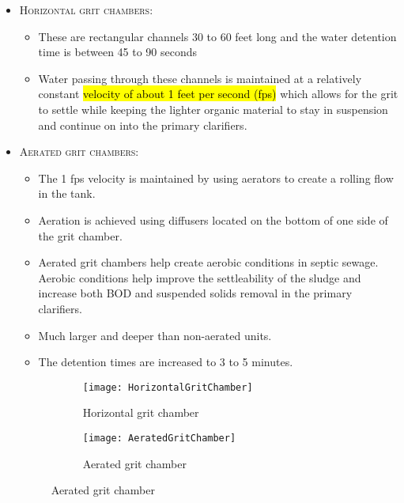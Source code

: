 			\begin{itemize}
			
					\item \noindent\textsc{Horizontal grit chambers:}

					\begin{itemize}
						\item These are rectangular channels 30 to 60 feet long and the water detention time is between 45 to 90 seconds
						\item Water passing through these channels is maintained at a relatively constant \hl{velocity of about 1 feet per second (fps)} which allows for the grit to settle while keeping the lighter organic material to stay in suspension and continue on into the primary clarifiers.
					\end{itemize}
	

						\item \noindent\textsc{Aerated grit chambers:}
	
					\begin{itemize}
						\item The 1 fps velocity is maintained by using aerators to create a rolling flow in the tank.
						\item Aeration is achieved using diffusers located on the bottom of one side of the grit chamber.
						\item Aerated grit chambers help create aerobic conditions in septic sewage. Aerobic conditions help improve the settleability of the sludge and increase both BOD and suspended solids removal in the primary clarifiers.
						\item Much larger and deeper than non-aerated units.
						\item The detention times are increased to 3 to 5 minutes.
					\end{itemize}

\begin{figure}[h!]
  \centering
  \begin{subfigure}[b]{0.46\linewidth}
    \texttt{[image: HorizontalGritChamber]}
    \caption{Horizontal grit chamber}
  \end{subfigure}
  \hspace{0.2cm}
  \begin{subfigure}[b]{0.5\linewidth}
    \texttt{[image: AeratedGritChamber]}
    \caption{Aerated grit chamber}
  \end{subfigure}
\end{figure} 					



\end{itemize}
